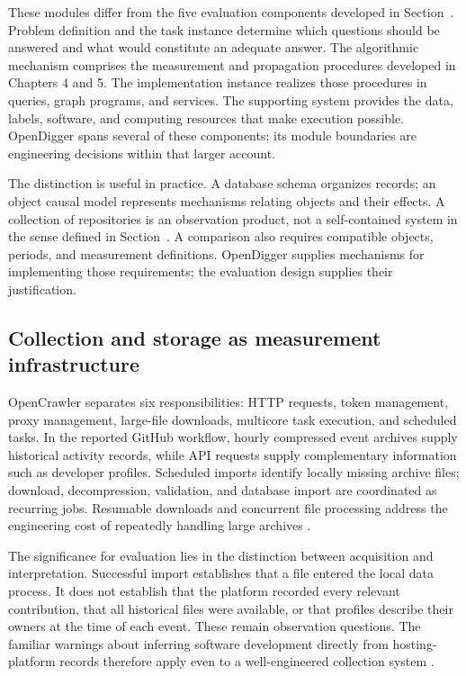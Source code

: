 

These modules differ from the five evaluation components developed in Section~. Problem definition and the task instance determine which questions should be answered and what would constitute an adequate answer. The algorithmic mechanism comprises the measurement and propagation procedures developed in Chapters 4 and 5. The implementation instance realizes those procedures in queries, graph programs, and services. The supporting system provides the data, labels, software, and computing resources that make execution possible. OpenDigger spans several of these components; its module boundaries are engineering decisions within that larger account.

The distinction is useful in practice. A database schema organizes records; an object causal model represents mechanisms relating objects and their effects. A collection of repositories is an observation product, not a self-contained system in the sense defined in Section~. A comparison also requires compatible objects, periods, and measurement definitions. OpenDigger supplies mechanisms for implementing those requirements; the evaluation design supplies their justification.

\subsection{Collection and storage as measurement infrastructure}
OpenCrawler separates six responsibilities: HTTP requests, token management, proxy management, large-file downloads, multicore task execution, and scheduled tasks. In the reported GitHub workflow, hourly compressed event archives supply historical activity records, while API requests supply complementary information such as developer profiles. Scheduled imports identify locally missing archive files; download, decompression, validation, and database import are coordinated as recurring jobs. Resumable downloads and concurrent file processing address the engineering cost of repeatedly handling large archives \citep[Sections 3.2--3.3]{wang2026digger}.

The significance for evaluation lies in the distinction between acquisition and interpretation. Successful import establishes that a file entered the local data process. It does not establish that the platform recorded every relevant contribution, that all historical files were available, or that profiles describe their owners at the time of each event. These remain observation questions. The familiar warnings about inferring software development directly from hosting-platform records therefore apply even to a well-engineered collection system \citep{kalliamvakou2014}.


